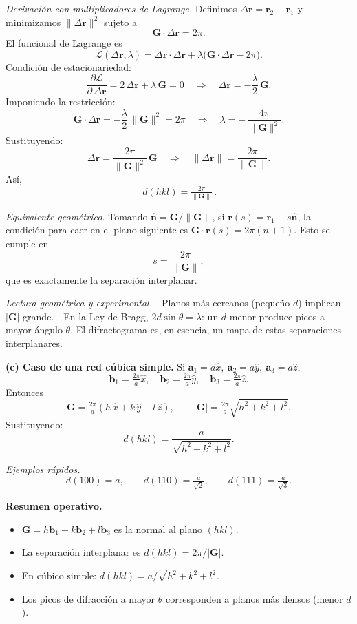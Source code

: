 \documentclass{article}
\begin{document}
\textit{Derivación con multiplicadores de Lagrange.}  
Definimos \(\Delta\mathbf{r}=\mathbf{r}_2-\mathbf{r}_1\) y minimizamos \(\|\Delta\mathbf{r}\|^2\) sujeto a
\[
\mathbf{G}\!\cdot\!\Delta\mathbf{r}=2\pi.
\]
El funcional de Lagrange es
\[
\mathcal{L}(\Delta\mathbf{r},\lambda)=\Delta\mathbf{r}\!\cdot\!\Delta\mathbf{r}+\lambda\big(\mathbf{G}\!\cdot\!\Delta\mathbf{r}-2\pi\big).
\]
Condición de estacionariedad:
\[
\frac{\partial\mathcal{L}}{\partial\,\Delta\mathbf{r}}=2\,\Delta\mathbf{r}+\lambda\,\mathbf{G}=0
\quad\Longrightarrow\quad
\Delta\mathbf{r}=-\frac{\lambda}{2}\,\mathbf{G}.
\]
Imponiendo la restricción:
\[
\mathbf{G}\!\cdot\!\Delta\mathbf{r}=-\frac{\lambda}{2}\,\|\mathbf{G}\|^2=2\pi
\quad\Rightarrow\quad
\lambda=-\,\frac{4\pi}{\|\mathbf{G}\|^2}.
\]
Sustituyendo:
\[
\Delta\mathbf{r}=\frac{2\pi}{\|\mathbf{G}\|^2}\,\mathbf{G}
\quad\Rightarrow\quad
\|\Delta\mathbf{r}\|=\frac{2\pi}{\|\mathbf{G}\|}.
\]
Así,
\[
\boxed{\,d(hkl)=\tfrac{2\pi}{\|\mathbf{G}\|}\,}.
\]

\textit{Equivalente geométrico.}  
Tomando \(\hat{\mathbf{n}}=\mathbf{G}/\|\mathbf{G}\|\), si \(\mathbf{r}(s)=\mathbf{r}_1+s\hat{\mathbf{n}}\), la condición para caer en el plano siguiente es
\(\mathbf{G}\cdot\mathbf{r}(s)=2\pi(n+1)\). Esto se cumple en
\[
s=\frac{2\pi}{\|\mathbf{G}\|},
\]
que es exactamente la separación interplanar.

\medskip
\noindent\textit{Lectura geométrica y experimental.}  
- Planos más cercanos (pequeño \(d\)) implican \(|\mathbf{G}|\) grande.  
- En la Ley de Bragg, \(2d\sin\theta=\lambda\): un \(d\) menor produce picos a mayor ángulo \(\theta\).  
El difractograma es, en esencia, un mapa de estas separaciones interplanares.

\bigskip
\textbf{(c) Caso de una red cúbica simple.}  
Si \(\mathbf{a}_1=a\hat{x},\ \mathbf{a}_2=a\hat{y},\ \mathbf{a}_3=a\hat{z}\),
\[
\mathbf{b}_1=\tfrac{2\pi}{a}\hat{x},\quad
\mathbf{b}_2=\tfrac{2\pi}{a}\hat{y},\quad
\mathbf{b}_3=\tfrac{2\pi}{a}\hat{z}.
\]
Entonces
\[
\mathbf{G}=\tfrac{2\pi}{a}(h\,\hat{x}+k\,\hat{y}+l\,\hat{z}),\qquad
|\mathbf{G}|=\tfrac{2\pi}{a}\sqrt{h^2+k^2+l^2}.
\]
Sustituyendo:
\[
d(hkl) = \frac{a}{\sqrt{h^2+k^2+l^2}}.
\]

\medskip
\noindent\textit{Ejemplos rápidos.}  
\[
d(100)=a,\qquad d(110)=\tfrac{a}{\sqrt{2}},\qquad d(111)=\tfrac{a}{\sqrt{3}}.
\]

\bigskip
\textbf{Resumen operativo.}
\begin{itemize}
\item \(\mathbf{G}=h\mathbf{b}_1+k\mathbf{b}_2+l\mathbf{b}_3\) es la normal al plano \((hkl)\).
\item La separación interplanar es \(d(hkl)=2\pi/|\mathbf{G}|\).
\item En cúbico simple: \(d(hkl)=a/\sqrt{h^2+k^2+l^2}\).
\item Los picos de difracción a mayor \(\theta\) corresponden a planos más densos (menor \(d\)).  
\end{itemize}
\end{document}
